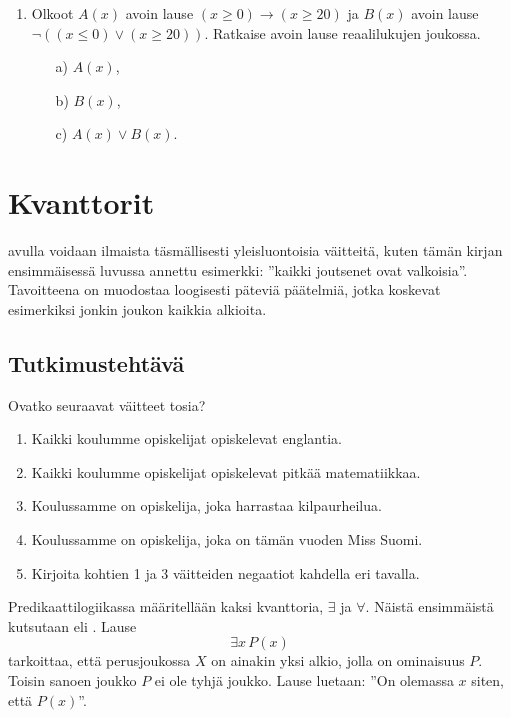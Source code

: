 \begin{enumerate}
\item
Olkoot $A(x)$ avoin lause $(x \ge 0) \to (x \ge 20)$
ja $B(x)$ avoin lause $\lnot ((x \le 0) \lor (x \ge 20))$. Ratkaise avoin lause reaalilukujen joukossa.
\begin{itemize}
\item[a)] $A(x)$,
\item[b)] $B(x)$,
\item[c)] $A(x) \lor B(x)$.
\end{itemize}

\end{enumerate}



\newpage

\section{Kvanttorit}
 avulla voidaan ilmaista täsmällisesti yleisluontoisia väitteitä, kuten tämän kirjan ensimmäisessä luvussa annettu esimerkki: ''kaikki joutsenet ovat valkoisia''. Tavoitteena on muodostaa loogisesti päteviä päätelmiä, jotka koskevat esimerkiksi jonkin joukon kaikkia alkioita.

\subsection*{Tutkimustehtävä}
Ovatko seuraavat väitteet tosia?
\begin{enumerate}
\item Kaikki koulumme opiskelijat opiskelevat englantia.
\item Kaikki koulumme opiskelijat opiskelevat pitkää matematiikkaa.
\item Koulussamme on opiskelija, joka harrastaa kilpaurheilua.
\item Koulussamme on opiskelija, joka on tämän vuoden Miss Suomi.
\item Kirjoita kohtien 1 ja 3 väitteiden negaatiot kahdella eri tavalla. 
\end{enumerate}

Predikaattilogiikassa määritellään kaksi kvanttoria, $\exists$ ja $\forall$. Näistä ensimmäistä kutsutaan  eli . Lause
\[
\exists x\, P(x)
\]
tarkoittaa, että perusjoukossa $X$ on ainakin yksi alkio, jolla on ominaisuus $P$. Toisin sanoen joukko $P$ ei ole tyhjä joukko. Lause luetaan: ''On olemassa $x$ siten, että $P(x)$''.

